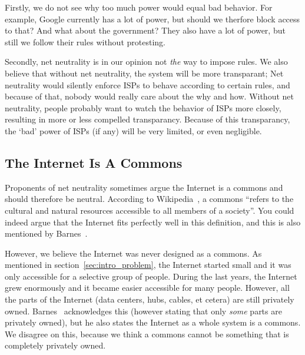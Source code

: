 Firstly, we do not see why too much power would equal bad behavior.
For example, Google currently has a lot of power, but should we therfore block access to that?
And what about the government?
They also have a lot of power, but still we follow their rules without protesting.

Secondly, net neutrality is in our opinion not \emph{the} way to impose rules.
We also believe that without net neutrality, the system will be more transparant;
Net neutrality would silently enforce \acp{ISP} to behave according to certain rules, and because of that, nobody would really care about the why and how.
Without net neutrality, people probably want to watch the behavior of \acp{ISP} more closely, resulting in more or less compelled transparancy.
Because of this transparancy, the `bad' power of \acp{ISP} (if any) will be very limited, or even negligible.

\subsection{The Internet Is A Commons}
Proponents of net neutrality sometimes argue the Internet is a commons and should therefore be neutral.
According to Wikipedia~\cite{wikipedia2014commons}, a commons ``refers to the cultural and natural resources accessible to all members of a society''.
You could indeed argue that the Internet fits perfectly well in this definition, and this is also mentioned by Barnes~\cite{barnes2003capitalism}.

However, we believe the Internet was never designed as a commons.
As mentioned in section~\ref{sec:intro_problem}, the Internet started small and it was only accessible for a selective group of people.
During the last years, the Internet grew enormously and it became easier accessible for many people.
However, all the parts of the Internet (data centers, hubs, cables, et cetera) are still privately owned.
Barnes~\cite{barnes2003capitalism} acknowledges this (however stating that only \emph{some} parts are privately owned), but he also states the Internet as a whole system is a commons.
We disagree on this, because we think a commons cannot be something that is completely privately owned.